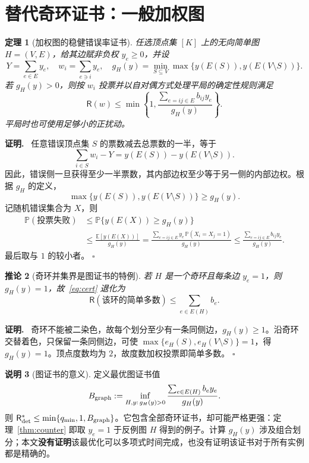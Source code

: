 \documentclass[11pt,a4paper]{ctexart}
\newtheorem{theorem}{定理}[section]
\newtheorem{corollary}[theorem]{推论}
\theoremstyle{definition}
\newtheorem{remark}[theorem]{说明}
\newenvironment{proofcn}{\par\noindent\textbf{证明.}\ }{\hfill $\square$\par}
\newcommand{\Risk}{\mathsf R}
\begin{document}
\section{替代奇环证书：一般加权图}
\begin{theorem}[加权图的稳健错误率证书]\label{thm:certificate}
任选顶点集 $[K]$ 上的无向简单图 $H=(V,E)$，给其边赋非负权 $y_e\ge0$，并设
\[
Y=\sum_{e\in E}y_e,\quad w_i=\sum_{e\ni i}y_e,
\quad g_H(y)=\min_{S\subseteq V}\max\{y(E(S)),y(E(V\setminus S))\}.
\]
若 $g_H(y)>0$，则按 $w_i$ 投票并以自对偶方式处理平局的确定性规则满足
\begin{equation}\label{eq:cert}
\boxed{\quad\Risk(w)\le\min\left\{1,\frac{\sum_{e=ij\in E}b_{ij}y_e}{g_H(y)}\right\}.\quad}
\end{equation}
平局时也可使用足够小的正扰动。
\end{theorem}
\begin{proofcn}
任意错误顶点集 $S$ 的票数减去总票数的一半，等于
\[
\sum_{i\in S}w_i-Y
=y(E(S))-y(E(V\setminus S)).
\]
因此，错误侧一旦获得至少一半票数，其内部边权至少等于另一侧的内部边权。根据 $g_H$ 的定义，\[\max\{y(E(S)),y(E(V\setminus S))\}\ge g_H(y).\]记随机错误集合为 $X$，则
\[
\begin{aligned}
\mathbb P(\text{投票失败})
&\le\mathbb P\{y(E(X))\ge g_H(y)\}\\
&\le\frac{\mathbb E[y(E(X))]}{g_H(y)}
=\frac{\sum_{e=ij\in E}y_e\,\mathbb P(X_i=X_j=1)}{g_H(y)}
\le\frac{\sum_{e=ij\in E}b_{ij}y_e}{g_H(y)}.
\end{aligned}
\]
最后取与 $1$ 的较小者。
\end{proofcn}

\begin{corollary}[奇环并集界是图证书的特例]
若 $H$ 是一个奇环且每条边 $y_e=1$，则 $g_H(y)=1$，故~\eqref{eq:cert} 退化为
\[
\Risk(\text{该环的简单多数})\le\sum_{e\in E(H)}b_e.
\]
\end{corollary}
\begin{proofcn}
奇环不能被二染色，故每个划分至少有一条同侧边，$g_H(y)\ge1$。沿奇环交替着色，只保留一条同侧边，可使 $\max\{e_H(S),e_H(V\setminus S)\}=1$，得 $g_H(y)=1$。顶点度数均为 $2$，故度数加权投票即简单多数。
\end{proofcn}

\begin{remark}[图证书的意义]
定义最优图证书值
\[
B_{\rm graph}:=\inf_{H,y:\,g_H(y)>0}\frac{\sum_{e\in E(H)}b_e y_e}{g_H(y)}.
\]
则 $\Risk^*_{\rm det}\le\min\{q_{\min},1,B_{\rm graph}\}$。它包含全部奇环证书，却可能严格更强：定理~\ref{thm:counter} 即取 $y_e=1$ 于反例图 $H$ 得到的例子。计算 $g_H(y)$ 涉及组合划分；本文\textbf{没有证明}该最优化可以多项式时间完成，也没有证明该证书对于所有实例都是精确的。
\end{remark}
\end{document}
